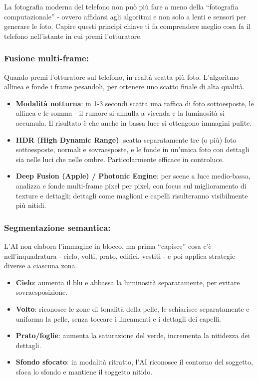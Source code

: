 
La fotografia moderna del telefono non può più fare a meno della “fotografia computazionale” - ovvero affidarsi agli algoritmi e non solo a lenti e sensori per generare le foto. Capire questi principi chiave ti fa comprendere meglio cosa fa il telefono nell'istante in cui premi l'otturatore.

\subsubsection*{Fusione multi-frame:}

Quando premi l'otturatore sul telefono, in realtà scatta più foto. L'algoritmo allinea e fonde i frame pesandoli, per ottenere uno scatto finale di alta qualità.

\begin{itemize}
  \item \textbf{Modalità notturna}: in 1-3 secondi scatta una raffica di foto sottoesposte, le allinea e le somma - il rumore si annulla a vicenda e la luminosità si accumula. Il risultato è che anche in bassa luce si ottengono immagini pulite.
  \item \textbf{HDR (High Dynamic Range)}: scatta separatamente tre (o più) foto sottoesposte, normali e sovraesposte, e le fonde in un'unica foto con dettagli sia nelle luci che nelle ombre. Particolarmente efficace in controluce.
  \item \textbf{Deep Fusion (Apple) / Photonic Engine}: per scene a luce medio-bassa, analizza e fonde multi-frame pixel per pixel, con focus sul miglioramento di texture e dettagli; dettagli come maglioni e capelli risulteranno visibilmente più nitidi.
\end{itemize}

\subsubsection*{Segmentazione semantica:}

L'AI non elabora l'immagine in blocco, ma prima “capisce” cosa c'è nell'inquadratura - cielo, volti, prato, edifici, vestiti - e poi applica strategie diverse a ciascuna zona.

\begin{itemize}
  \item \textbf{Cielo}: aumenta il blu e abbassa la luminosità separatamente, per evitare sovraesposizione.
  \item \textbf{Volto}: riconosce le zone di tonalità della pelle, le schiarisce separatamente e uniforma la pelle, senza toccare i lineamenti e i dettagli dei capelli.
  \item \textbf{Prato/foglie}: aumenta la saturazione del verde, incrementa la nitidezza dei dettagli.
  \item \textbf{Sfondo sfocato}: in modalità ritratto, l'AI riconosce il contorno del soggetto, sfoca lo sfondo e mantiene il soggetto nitido.
\end{itemize}

